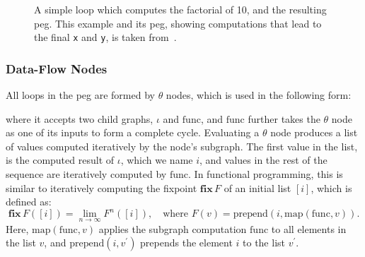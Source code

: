\begin{figure}[ht]
{\begin{minipage}{0.5\textwidth}
        \end{minipage}\label{bg:fig:factorial_peg}
    }
    \caption{%
        A simple loop which computes the factorial of 10, and the resulting
        \gls{peg}\@.  This example and its \gls{peg}, showing computations
        that lead to the final \texttt{x} and \texttt{y}, is taken
        from~\cite{tate09}.
    }\label{bg:fig:factorial}
\end{figure}

\subsubsection{Data-Flow Nodes}

All loops in the \gls{peg} are formed by $\theta$ nodes, which is used in the
following form:
\begin{center}
    \vspace{-16.5pt}
    \vspace{-16.5pt}
\end{center}
where it accepts two child graphs, $\iota$ and $\mathrm{func}$, and
$\mathrm{func}$ further takes the $\theta$ node as one of its inputs to
form a complete cycle.  Evaluating a $\theta$ node produces a list of
values computed iteratively by the node's subgraph.  The first value in the
list, is the computed result of $\iota$, which we name $i$, and values in
the rest of the sequence are iteratively computed by $\mathrm{func}$.  In
functional programming, this is similar to iteratively computing the fixpoint
$\mathbf{fix}\,F$ of an initial list $[i]$, which is defined as:
\begin{equation}
    \mathbf{fix}\,F ([i]) = \lim_{n \to \infty} F^n ([i]),
    \quad\text{where~}
    F(v) = \mathrm{prepend}\left(
        i, \mathrm{map}\left( \mathrm{func}, v \right)
    \right).
\end{equation}
Here, $\mathrm{map}(\mathrm{func}, v)$ applies the subgraph computation
$\mathrm{func}$ to all elements in the list $v$, and $\mathrm{prepend}(i,
v^\prime)$ prepends the element $i$ to the list $v^\prime$.

